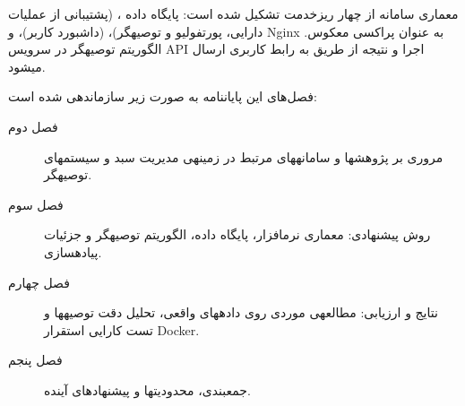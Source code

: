 معماری سامانه از چهار ریزخدمت تشکیل شده است: پایگاه داده ،  (پشتیبانی از عملیات دارایی، پورتفولیو و توصیه\rtl{-}گر)،  (داشبورد کاربر)،  و Nginx به عنوان پراکسی معکوس. الگوریتم توصیه\rtl{-}گر در سرویس API اجرا و نتیجه از طریق  به رابط کاربری ارسال می\rtl{-}شود.

فصل‌\rtl{-}های این پایان\rtl{-}نامه به صورت زیر سازمان\rtl{-}دهی شده است:
\begin{description}
  \item[فصل دوم] مروری بر پژوهش\rtl{-}ها و سامانه\rtl{-}های مرتبط در زمینه\rtl{-}ی مدیریت سبد و سیستم\rtl{-}های توصیه\rtl{-}گر.
  \item[فصل سوم] روش پیشنهادی: معماری نرم\rtl{-}افزار، پایگاه داده، الگوریتم توصیه\rtl{-}گر و جزئیات پیاده\rtl{-}سازی.
  \item[فصل چهارم] نتایج و ارزیابی: مطالعه\rtl{-}ی موردی روی داده\rtl{-}های واقعی، تحلیل دقت توصیه\rtl{-}ها و تست کارایی استقرار Docker.
  \item[فصل پنجم] جمع\rtl{-}بندی، محدودیت\rtl{-}ها و پیشنهادهای آینده.
\end{description}

\newpage